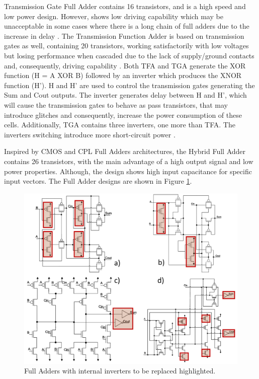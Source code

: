 \documentclass[pgmicro,mestrado,english]{iiufrgs}
\begin{document}
Transmission Gate Full Adder \cite{weste1985principles} contains 16 transistors, and is a high speed and low power design. However, shows low driving capability which may be unacceptable in some cases where there is a long chain of full adders due to the increase in delay \cite{islam2011design}. The Transmission Function Adder is based on transmission gates as well, containing 20 transistors, working satisfactorily with low voltages but losing performance when cascaded due to the lack of supply/ground contacts and, consequently, driving capability \cite{navi2009novel}. Both TFA and TGA generate the XOR function (H = A XOR B) followed by an inverter which produces the XNOR function (H’). H and H’ are used to control the transmission gates generating the Sum and Cout outputs. The inverter generates delay between H and H’, which will cause the transmission gates to behave as pass transistors, that may introduce glitches and consequently, increase the power consumption of these cells. Additionally, TGA contains three inverters, one more than TFA. The inverters switching introduce more short-circuit power \cite{shams2000novel}.

Inspired by CMOS and CPL Full Adders architectures, the Hybrid Full Adder \cite{navi2009novel} contains 26 transistors, with the main advantage of a high output signal and low power properties. Although, the design shows high input capacitance for specific input vectors. The Full Adder designs are shown in Figure \ref{fig:FAs}.

\begin{figure}[H]
\centering
\includegraphics[width=1\textwidth]{FAs.png}
\caption{Full Adders with internal inverters to be replaced highlighted.}
\label{fig:FAs}
\end{figure}
\end{document}
